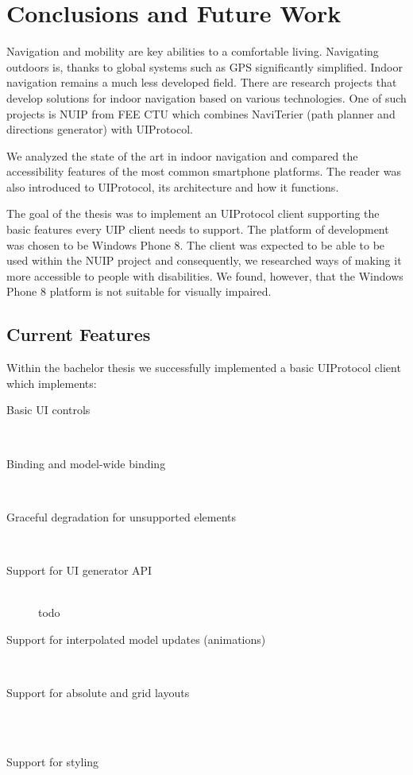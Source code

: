 \chapter{Conclusions and Future Work}
Navigation and mobility are key abilities to a comfortable living. Navigating outdoors is, thanks to global systems such as GPS significantly simplified. Indoor navigation remains a much less developed field. There are research projects that develop solutions for indoor navigation based on various technologies. One of such projects is NUIP from FEE CTU which combines NaviTerier (path planner and directions generator) with UIProtocol.

We analyzed the state of the art in indoor navigation and compared the accessibility features of the most common smartphone platforms. The reader was also introduced to UIProtocol, its architecture and how it functions.

The goal of the thesis was to implement an UIProtocol client supporting the basic features every UIP client needs to support. The platform of development was chosen to be Windows Phone 8. The client was expected to be able to be used within the NUIP project and consequently, we researched ways of making it more accessible to people with disabilities. We found, however, that the Windows Phone 8 platform is not suitable for visually impaired.

\section{Current Features}
Within the bachelor thesis we successfully implemented a basic UIProtocol client which implements:

\begin{description}
  \item[Basic UI controls] \hfill \\
  
  \item[Binding and model-wide binding] \hfill \\
  \item[Graceful degradation for unsupported elements] \hfill \\
  \item[Support for UI generator API] \hfill \\
  todo
  \item[Support for interpolated model updates (animations)] \hfill \\
  \item[Support for absolute and grid layouts] \hfill \\\\
  \item[Support for styling] \hfill \\\\
\end{description}

